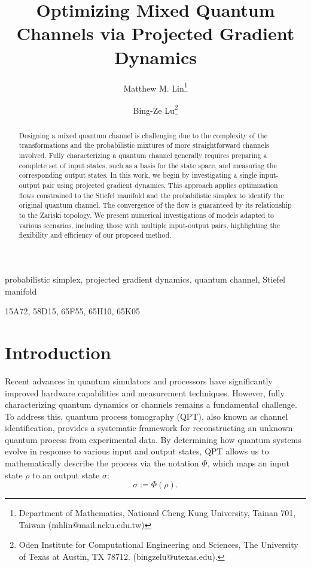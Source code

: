 \documentclass[onefignum,onetabnum]{siamart220329}
\title{ 
    Optimizing Mixed Quantum Channels via Projected Gradient Dynamics
    }
\author{
    Matthew M. Lin\thanks{
    Department of Mathematics, National Cheng Kung University, Tainan 701, Taiwan ({mhlin@mail.ncku.edu.tw})} \and 
    Bing-Ze Lu\thanks{Oden Institute for Computational Engineering and Sciences, The University of Texas at Austin, TX 78712. (bingzelu@utexas.edu).} 
    }
\begin{document}
    
    \maketitle
    
    \begin{abstract}
    Designing a mixed quantum channel is challenging due to the complexity of the transformations and the probabilistic mixtures of more straightforward channels involved. Fully characterizing a quantum channel generally requires preparing a complete set of input states, such as a basis for the state space, and measuring the corresponding output states. In this work, we begin by investigating a single input-output pair using projected gradient dynamics. This approach applies optimization flows constrained to the Stiefel manifold and the probabilistic simplex to identify the original quantum channel. The convergence of the flow is guaranteed by its relationship to the Zariski topology. We present numerical investigations of models adapted to various scenarios, including those with multiple input-output pairs, highlighting the flexibility and efficiency of our proposed method.
    
    \end{abstract}
    
    \begin{keywords}
    probabilistic simplex, projected gradient dynamics, quantum channel, 
    Stiefel manifold %
    \end{keywords}
    
    \begin{AMS}
    15A72, 58D15, 65F55, 65H10, 65K05
    \end{AMS}
    
    \section{Introduction}
    Recent advances in quantum simulators and processors have significantly improved hardware capabilities and measurement techniques. However, fully characterizing quantum dynamics or channels remains a fundamental challenge. To address this, quantum process tomography (QPT), also known as channel identification, provides a systematic framework for reconstructing an unknown quantum process from experimental data. By determining how quantum systems evolve in response to various input and output states, QPT allows us to mathematically describe the process via the notation $\Phi$, which maps an input state $\rho$ to an output state \(\sigma\):  
    \[
    \sigma := \Phi(\rho).
    \]  
    
\end{document}
